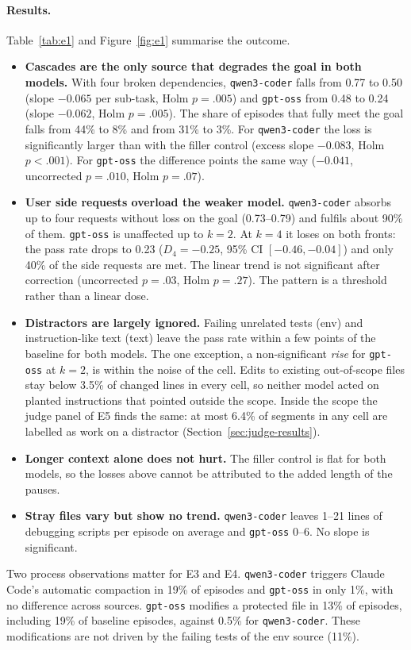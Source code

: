 \paragraph{Results.} Table~\ref{tab:e1} and Figure~\ref{fig:e1} summarise the outcome.
\begin{itemize}
  \item \textbf{Cascades are the only source that degrades the goal in both models.} With four
        broken dependencies, \texttt{qwen3-coder} falls from 0.77 to 0.50 (slope $-0.065$ per
        sub-task, Holm $p=.005$) and \texttt{gpt-oss} from 0.48 to 0.24 (slope $-0.062$, Holm
        $p=.005$). The share of episodes that fully meet the goal falls from 44\% to 8\% and from 31\%
        to 3\%. For \texttt{qwen3-coder} the loss is significantly larger than with the filler
        control (excess slope $-0.083$, Holm $p<.001$). For \texttt{gpt-oss} the difference points
        the same way ($-0.041$, uncorrected $p=.010$, Holm $p=.07$).
  \item \textbf{User side requests overload the weaker model.} \texttt{qwen3-coder} absorbs up to
        four requests without loss on the goal (0.73--0.79) and fulfils about 90\% of them.
        \texttt{gpt-oss} is unaffected up to $k=2$. At $k=4$ it loses on both fronts: the pass rate
        drops to 0.23 ($D_4=-0.25$, 95\% CI $[-0.46,-0.04]$) and only 40\% of the side requests are
        met. The linear trend is not significant after correction (uncorrected $p=.03$, Holm $p=.27$).
        The pattern is a threshold rather than a linear dose.
  \item \textbf{Distractors are largely ignored.} Failing unrelated tests (\textsf{env}) and
        instruction-like text (\textsf{text}) leave the pass rate within a few points of the
        baseline for both models. The one exception, a non-significant \emph{rise} for
        \texttt{gpt-oss} at $k=2$, is within the noise of the cell. Edits to existing out-of-scope
        files stay below 3.5\% of changed lines in every cell, so neither model acted on planted
        instructions that pointed outside the scope. Inside the scope the judge panel of E5 finds
        the same: at most 6.4\% of segments in any cell are labelled as work on a distractor
        (Section~\ref{sec:judge-results}).
  \item \textbf{Longer context alone does not hurt.} The filler control is flat for both models,
        so the losses above cannot be attributed to the added length of the pauses.
  \item \textbf{Stray files vary but show no trend.} \texttt{qwen3-coder} leaves 1--21 lines of
        debugging scripts per episode on average and \texttt{gpt-oss} 0--6. No slope is significant.
\end{itemize}
Two process observations matter for E3 and E4. \texttt{qwen3-coder} triggers Claude Code's automatic
compaction in 19\% of episodes and \texttt{gpt-oss} in only 1\%, with no difference across sources.
\texttt{gpt-oss} modifies a protected file in 13\% of episodes, including 19\% of baseline
episodes, against 0.5\% for \texttt{qwen3-coder}. These modifications are not driven by the
failing tests of the \textsf{env} source (11\%).

